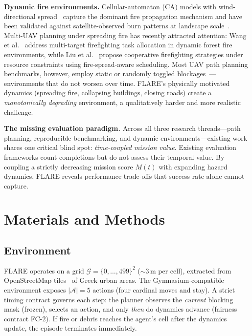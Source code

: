 \documentclass[drones,article,submit,moreauthors]{Definitions/mdpi}
\begin{document}
\textbf{Dynamic fire environments.} Cellular-automaton (CA) models with
wind-directional spread~\cite{Alexandridis2008,Giannino2025,Sahila2025}
capture the dominant fire propagation mechanism and have been validated
against satellite-observed burn patterns at landscape
scale~\cite{NatureFire2025}. Multi-UAV
planning under spreading fire has recently attracted attention: Wang et
al.~\cite{Wang2025fire} address multi-target firefighting task
allocation in dynamic forest fire environments, while Liu et
al.~\cite{Liu2025swarm} propose cooperative firefighting strategies
under resource constraints using fire-spread-aware scheduling. Most UAV
path planning benchmarks, however, employ static or randomly toggled
blockages~\cite{Zhao2020}---environments that do not worsen over
time. FLARE's physically motivated dynamics (spreading fire, collapsing
buildings, closing roads) create a \emph{monotonically degrading}
environment, a qualitatively harder and more realistic challenge.

\textbf{The missing evaluation paradigm.} Across all three research
threads---path planning, reproducible benchmarking, and dynamic
environments---existing work shares one critical blind spot:
\emph{time-coupled mission value}. Existing evaluation frameworks count
completions but do not assess their temporal value. By coupling a strictly
decreasing mission score $M(t)$ with expanding hazard dynamics, FLARE
reveals performance trade-offs that success rate alone cannot capture.

\section{Materials and Methods}\label{sec:methods}

\subsection{Environment}\label{sec:environment}

FLARE operates on a grid $\mathcal{G} = \{0,\dots,499\}^2$ (${\sim}3$\,m
per cell), extracted from OpenStreetMap tiles~\cite{Boeing2017} of Greek
urban areas. The Gymnasium-compatible~\cite{Towers2025} environment exposes
$|\mathcal{A}|{=}5$ actions (four cardinal moves and stay). A strict timing
contract governs each step: the planner observes the \emph{current}
blocking mask (frozen), selects an action, and only \emph{then} do dynamics
advance (fairness contract FC-2). If fire or debris reaches the agent's
cell after the dynamics update, the episode terminates immediately.
\end{document}
